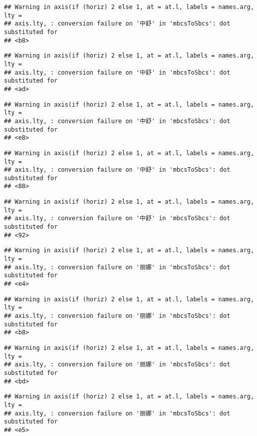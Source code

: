 \documentclass[
]{article}
\begin{document}
\begin{verbatim}
## Warning in axis(if (horiz) 2 else 1, at = at.l, labels = names.arg, lty =
## axis.lty, : conversion failure on '中舒' in 'mbcsToSbcs': dot substituted for
## <b8>
\end{verbatim}

\begin{verbatim}
## Warning in axis(if (horiz) 2 else 1, at = at.l, labels = names.arg, lty =
## axis.lty, : conversion failure on '中舒' in 'mbcsToSbcs': dot substituted for
## <ad>
\end{verbatim}

\begin{verbatim}
## Warning in axis(if (horiz) 2 else 1, at = at.l, labels = names.arg, lty =
## axis.lty, : conversion failure on '中舒' in 'mbcsToSbcs': dot substituted for
## <e8>
\end{verbatim}

\begin{verbatim}
## Warning in axis(if (horiz) 2 else 1, at = at.l, labels = names.arg, lty =
## axis.lty, : conversion failure on '中舒' in 'mbcsToSbcs': dot substituted for
## <88>
\end{verbatim}

\begin{verbatim}
## Warning in axis(if (horiz) 2 else 1, at = at.l, labels = names.arg, lty =
## axis.lty, : conversion failure on '中舒' in 'mbcsToSbcs': dot substituted for
## <92>
\end{verbatim}

\begin{verbatim}
## Warning in axis(if (horiz) 2 else 1, at = at.l, labels = names.arg, lty =
## axis.lty, : conversion failure on '丽娜' in 'mbcsToSbcs': dot substituted for
## <e4>
\end{verbatim}

\begin{verbatim}
## Warning in axis(if (horiz) 2 else 1, at = at.l, labels = names.arg, lty =
## axis.lty, : conversion failure on '丽娜' in 'mbcsToSbcs': dot substituted for
## <b8>
\end{verbatim}

\begin{verbatim}
## Warning in axis(if (horiz) 2 else 1, at = at.l, labels = names.arg, lty =
## axis.lty, : conversion failure on '丽娜' in 'mbcsToSbcs': dot substituted for
## <bd>
\end{verbatim}

\begin{verbatim}
## Warning in axis(if (horiz) 2 else 1, at = at.l, labels = names.arg, lty =
## axis.lty, : conversion failure on '丽娜' in 'mbcsToSbcs': dot substituted for
## <e5>
\end{verbatim}
\end{document}
